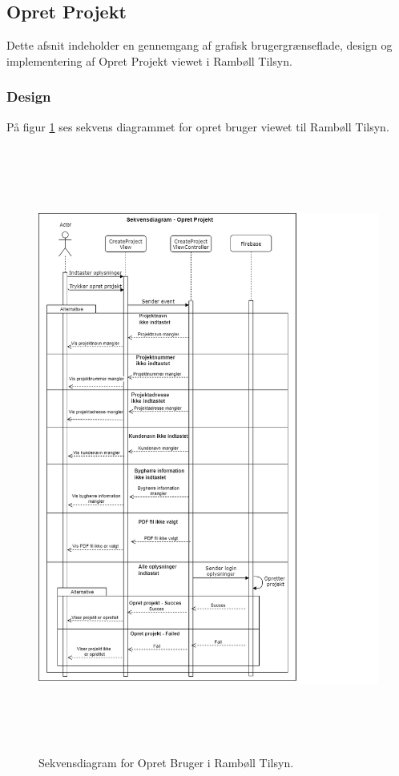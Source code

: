 \subsection{Opret Projekt}
Dette afsnit indeholder en gennemgang af grafisk brugergrænseflade, design og implementering af Opret Projekt viewet i Rambøll Tilsyn.

\subsubsection{Design}
På figur \ref{fig:OpretProjektSekvens} ses sekvens diagrammet for opret bruger viewet til Rambøll Tilsyn.
\begin{figure}[H] %
	\centering
	\includegraphics[height=20cm, width=15cm]{../ArkitekturDesign/Design/OpretProjekt/OpretProjektSekvensDiagram}
	\caption{Sekvensdiagram for Opret Bruger i Rambøll Tilsyn.}
	\label{fig:OpretProjektSekvens}
\end{figure}

